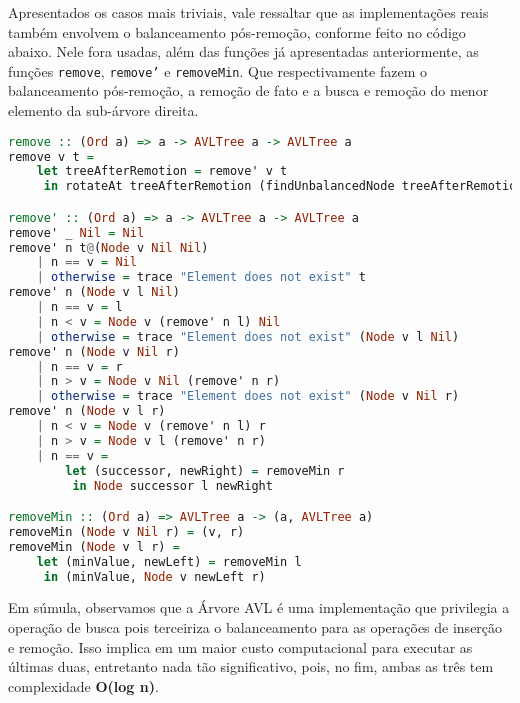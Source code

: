 Apresentados os casos mais triviais, vale ressaltar que as implementações reais também envolvem o balanceamento pós-remoção, conforme feito no código abaixo. Nele fora usadas, além das funções já apresentadas anteriormente, as funções \texttt{remove}, \texttt{remove'} e \texttt{removeMin}. Que respectivamente fazem o balanceamento pós-remoção, a remoção de fato e a busca e remoção do menor elemento da sub-árvore direita.

\begin{lstlisting}[language=haskell]
remove :: (Ord a) => a -> AVLTree a -> AVLTree a
remove v t =
    let treeAfterRemotion = remove' v t
     in rotateAt treeAfterRemotion (findUnbalancedNode treeAfterRemotion)

remove' :: (Ord a) => a -> AVLTree a -> AVLTree a
remove' _ Nil = Nil
remove' n t@(Node v Nil Nil)
    | n == v = Nil
    | otherwise = trace "Element does not exist" t
remove' n (Node v l Nil)
    | n == v = l
    | n < v = Node v (remove' n l) Nil
    | otherwise = trace "Element does not exist" (Node v l Nil)
remove' n (Node v Nil r)
    | n == v = r
    | n > v = Node v Nil (remove' n r)
    | otherwise = trace "Element does not exist" (Node v Nil r)
remove' n (Node v l r)
    | n < v = Node v (remove' n l) r
    | n > v = Node v l (remove' n r)
    | n == v =
        let (successor, newRight) = removeMin r
         in Node successor l newRight

removeMin :: (Ord a) => AVLTree a -> (a, AVLTree a)
removeMin (Node v Nil r) = (v, r)
removeMin (Node v l r) =
    let (minValue, newLeft) = removeMin l
     in (minValue, Node v newLeft r)
\end{lstlisting}

Em súmula, observamos que a Árvore AVL é uma implementação que privilegia a operação de busca pois terceiriza o balanceamento para as operações de inserção e remoção. Isso implica em um maior custo computacional para executar as últimas duas, entretanto nada tão significativo, pois, no fim, ambas as três tem complexidade \textbf{O(log n)}.
